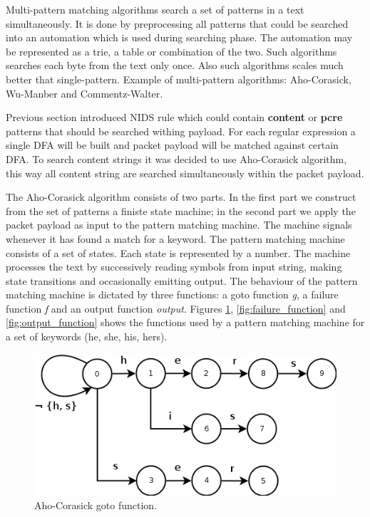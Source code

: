 \documentclass[thesis=M,english]{FITthesis}[2011/07/15]
\begin{document}
Multi-pattern matching algorithms search a set of patterns in a text simultaneously. It is done by preprocessing all patterns that could be searched into an automation which is used during searching phase. The automation may be represented as a trie, a table or combination of the two. Such algorithms searches each byte from the text only once. Also such algorithms scales much better that single-pattern. Example of multi-pattern algorithms: Aho-Corasick, Wu-Manber and Commentz-Walter.

Previous section introduced NIDS rule which could contain \textbf{content} or \textbf{pcre} patterns that should be searched withing payload. For each regular expression a single DFA will be built and packet payload will be matched against certain DFA. To search content strings it was decided to use Aho-Corasick algorithm, this way all content string are searched simultaneously within the packet payload.

The Aho-Corasick algorithm consists of two parts. In the first part we construct from the set of patterns a finiste state machine; in the second part we apply the packet payload as input to the pattern matching machine. The machine signals whenever it has found a match for a keyword. The pattern matching machine consists of a set of states. Each state is represented by a number. The machine processes the text by successively reading symbols from input string, making state transitions and occasionally emitting output. The behaviour of the pattern matching machine is dictated by three functions: a goto function \emph{g}, a failure function \emph{f} and an output function \emph{output}. Figures \ref{fig:goto_function}, \ref{fig:failure_function} and \ref{fig:output_function} shows the functions used by a pattern matching machine for a set of keywords (he, she, his, hers).

\begin{figure}[h]
\centering
\includegraphics[scale=0.5]{images/goto_function.png}
\caption{Aho-Corasick goto function.}
\label{fig:goto_function}
\end{figure}
\end{document}
